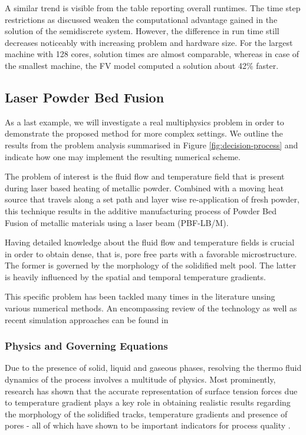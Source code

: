 \documentclass[sn-mathphys,Numbered]{sn-jnl}%
\theoremstyle{thmstyleone}%
\theoremstyle{thmstyletwo}%
\theoremstyle{thmstylethree}%
\begin{document}
A similar trend is visible from the table reporting overall runtimes.
The time step restrictions as discussed weaken the computational advantage gained in the solution of the semidiscrete system.
However, the difference in run time still decreases noticeably with increasing problem and hardware size.
For the largest machine with 128 cores, solution times are almost comparable, whereas in case of the smallest machine, the FV model computed a solution about 42\% faster.

\subsection{Laser Powder Bed Fusion}

As a last example, we will investigate a real multiphysics problem in order to demonstrate the proposed method for more complex settings.
We outline the results from the problem analysis summarised in Figure \ref{fig:decision-process} and indicate how one may implement the resulting numerical scheme.

The problem of interest is the fluid flow and temperature field that is present during laser based heating of metallic powder.
Combined with a moving heat source that travels along a set path and layer wise re-application of fresh powder, this technique results in the additive manufacturing process of Powder Bed Fusion of metallic materials using a laser beam (PBF-LB/M).

Having detailed knowledge about the fluid flow and temperature fields is crucial in order to obtain dense, that is,  pore free parts with a favorable microstructure.
The former is governed by the morphology of the solidified melt pool. The latter is heavily influenced by the spatial and temporal temperature gradients.

This specific problem has been tackled many times in the literature unsing various numerical methods.
An encompassing review of the technology as well as recent simulation approaches can be found in \cite{chowdhuryLaserPowderBed2022}

\subsubsection{Physics and Governing Equations}

Due to the presence of solid, liquid and gaseous phases, resolving the thermo fluid dynamics of the process involves a multitude of physics.
Most prominently, research has shown that the accurate representation of surface tension forces due to temperature gradient plays a key role in obtaining realistic results regarding the morphology of the solidified tracks, temperature gradients and presence of pores - all of which have shown to be important indicators for process quality \cite{debroyAdditiveManufacturingMetallic2018a}.
\end{document}
